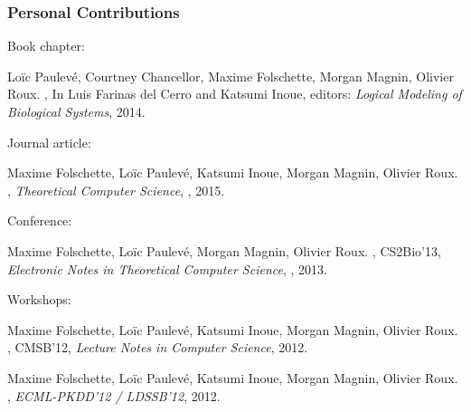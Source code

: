 

\begin{frame}[c]
  \frametitle{Personal Contributions}

\small
Book chapter:

\tcitebullet Loïc Paulevé, Courtney Chancellor, Maxime Folschette, Morgan Magnin, Olivier Roux.
,
In Luis Farinas del Cerro and Katsumi Inoue, editors: \textit{Logical Modeling of Biological Systems}, 2014.

\medskip
Journal article:

\tcitebullet Maxime Folschette, Loïc Paulevé, Katsumi Inoue, Morgan Magnin, Olivier Roux.
,
\textit{Theoretical Computer Science}, , 2015.

\medskip
Conference:

\tcitebullet Maxime Folschette, Loïc Paulevé, Morgan Magnin, Olivier Roux.
,
CS2Bio'13, \textit{Electronic Notes in Theoretical Computer Science}, , 2013.

\medskip
Workshops:

\tcitebullet Maxime Folschette, Loïc Paulevé, Katsumi Inoue, Morgan Magnin, Olivier Roux.
,
CMSB'12, \textit{Lecture Notes in Computer Science}, 2012.

\tcitebullet Maxime Folschette, Loïc Paulevé, Katsumi Inoue, Morgan Magnin, Olivier Roux.
,
\textit{ECML-PKDD'12 / LDSSB'12}, 2012.

\end{frame}



